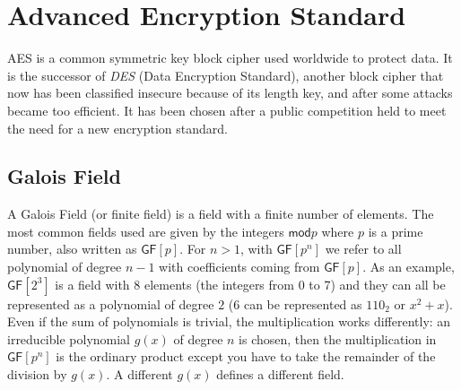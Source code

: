 \section{Advanced Encryption Standard}
AES is a common symmetric key block cipher used worldwide to protect data. It is the successor of \emph{DES} (Data Encryption Standard), another block cipher that now has been classified insecure because of its length key, and after some attacks became too efficient. It has been chosen after a public competition held to meet the need for a new encryption standard.\\

\subsection{Galois Field}
A Galois Field (or finite field) is a field with a finite number of elements. The most common fields used are given by the integers $\mathsf{mod} p$ where $p$ is a prime number, also written as $\mathsf{GF}[p]$. For $n > 1$, with $\mathsf{GF}[p^n]$ we refer to all polynomial of degree $n-1$ with coefficients coming from $\mathsf{GF}[p]$. As an example, $\mathsf{GF}[2^3]$ is a field with $8$ elements (the integers from 0 to 7) and they can all be represented as a polynomial of degree $2$ (6 can be represented as $110_2$ or $x^2+x$).\\
Even if the sum of polynomials is trivial, the multiplication works differently: an irreducible polynomial $g(x)$ of degree $n$ is chosen, then the multiplication in $\mathsf{GF}[p^n]$ is the ordinary product except you have to take the remainder of the division by $g(x)$. A different $g(x)$ defines a different field.

